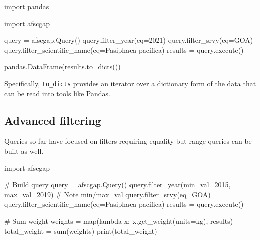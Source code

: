 \documentclass[
  letterpaper,
  oneside,
  open=any]{scrbook}
\newenvironment{Shaded}{\begin{snugshade}}{\end{snugshade}}
\newcommand{\AttributeTok}[1]{\textcolor[rgb]{0.40,0.45,0.13}{#1}}
\newcommand{\CommentTok}[1]{\textcolor[rgb]{0.37,0.37,0.37}{#1}}
\newcommand{\DecValTok}[1]{\textcolor[rgb]{0.68,0.00,0.00}{#1}}
\newcommand{\FunctionTok}[1]{\textcolor[rgb]{0.28,0.35,0.67}{#1}}
\newcommand{\NormalTok}[1]{\textcolor[rgb]{0.00,0.23,0.31}{#1}}
\newcommand{\OtherTok}[1]{\textcolor[rgb]{0.00,0.23,0.31}{#1}}
\newcommand{\SpecialCharTok}[1]{\textcolor[rgb]{0.37,0.37,0.37}{#1}}
\newcommand{\StringTok}[1]{\textcolor[rgb]{0.13,0.47,0.30}{#1}}
\begin{document}
\begin{Shaded}
\begin{Highlighting}[]
\NormalTok{import pandas}

\NormalTok{import afscgap}

\NormalTok{query }\OtherTok{=} \FunctionTok{afscgap.Query}\NormalTok{()}
\FunctionTok{query.filter\_year}\NormalTok{(}\AttributeTok{eq=}\DecValTok{2021}\NormalTok{)}
\FunctionTok{query.filter\_srvy}\NormalTok{(}\AttributeTok{eq=}\StringTok{\textquotesingle{}GOA\textquotesingle{}}\NormalTok{)}
\FunctionTok{query.filter\_scientific\_name}\NormalTok{(}\AttributeTok{eq=}\StringTok{\textquotesingle{}Pasiphaea pacifica\textquotesingle{}}\NormalTok{)}
\NormalTok{results }\OtherTok{=} \FunctionTok{query.execute}\NormalTok{()}

\FunctionTok{pandas.DataFrame}\NormalTok{(}\FunctionTok{results.to\_dicts}\NormalTok{())}
\end{Highlighting}
\end{Shaded}

Specifically, \texttt{to\_dicts} provides an iterator over a dictionary
form of the data that can be read into tools like Pandas.

\subsection{Advanced filtering}\label{advanced-filtering}

Queries so far have focused on filters requiring equality but range
queries can be built as well.

\begin{Shaded}
\begin{Highlighting}[]
\NormalTok{import afscgap}

\CommentTok{\# Build query}
\NormalTok{query }\OtherTok{=} \FunctionTok{afscgap.Query}\NormalTok{()}
\FunctionTok{query.filter\_year}\NormalTok{(}\AttributeTok{min\_val=}\DecValTok{2015}\NormalTok{, }\AttributeTok{max\_val=}\DecValTok{2019}\NormalTok{)   }\CommentTok{\# Note min/max\_val}
\FunctionTok{query.filter\_srvy}\NormalTok{(}\AttributeTok{eq=}\StringTok{\textquotesingle{}GOA\textquotesingle{}}\NormalTok{)}
\FunctionTok{query.filter\_scientific\_name}\NormalTok{(}\AttributeTok{eq=}\StringTok{\textquotesingle{}Pasiphaea pacifica\textquotesingle{}}\NormalTok{)}
\NormalTok{results }\OtherTok{=} \FunctionTok{query.execute}\NormalTok{()}

\CommentTok{\# Sum weight}
\NormalTok{weights }\OtherTok{=} \FunctionTok{map}\NormalTok{(lambda x}\SpecialCharTok{:} \FunctionTok{x.get\_weight}\NormalTok{(}\AttributeTok{units=}\StringTok{\textquotesingle{}kg\textquotesingle{}}\NormalTok{), results)}
\NormalTok{total\_weight }\OtherTok{=} \FunctionTok{sum}\NormalTok{(weights)}
\FunctionTok{print}\NormalTok{(total\_weight)}
\end{Highlighting}
\end{Shaded}
\end{document}
